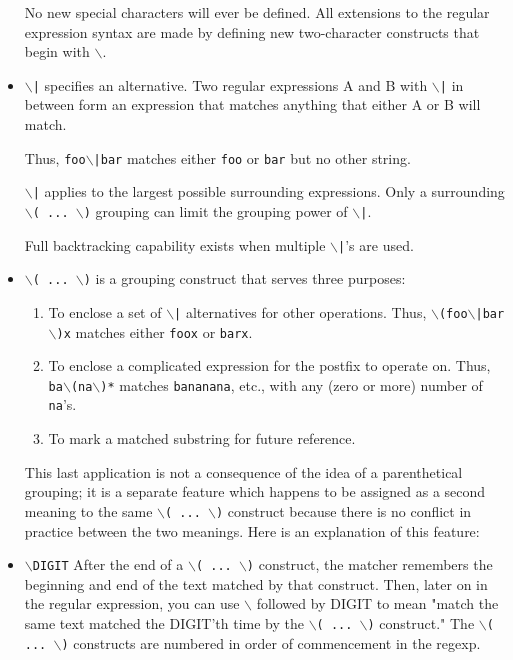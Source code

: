 \begin{itemize}
No new special characters will ever be defined. All extensions
to the regular expression syntax are made by defining new
two-character constructs that begin with {\tt $\backslash$}.

\item \rtfsp
{\tt $\backslash$|} 
specifies an alternative. Two regular expressions A and B with
{\tt $\backslash$|} in between form an expression that matches anything that
either A or B will match.

Thus, {\tt foo$\backslash$|bar} matches either {\tt foo} or {\tt bar} but no other
string.

{\tt $\backslash$|} applies to the largest possible surrounding expressions. 
Only a surrounding {\tt $\backslash$( ... $\backslash$)} grouping can limit the grouping
power of {\tt $\backslash$|}.

Full backtracking capability exists when multiple {\tt $\backslash$|}'s are used.

\item \rtfsp
{\tt $\backslash$( ... $\backslash$)} 
is a grouping construct that serves three purposes:
\begin{enumerate}
\item To enclose a set of {\tt $\backslash$|} alternatives for other operations.
Thus, {\tt $\backslash$(foo$\backslash$|bar$\backslash$)x} matches either {\tt foox} or {\tt barx}.
\item To enclose a complicated expression for the postfix {\tt *} to
operate on. Thus, {\tt ba$\backslash$(na$\backslash$)*} matches {\tt bananana}, etc.,
with any (zero or more) number of {\tt na}'s.
\item To mark a matched substring for future reference.
\end{enumerate}

This last application is not a consequence of the idea of a
parenthetical grouping; it is a separate feature which happens
to be assigned as a second meaning to the same {\tt $\backslash$( ... $\backslash$)} 
construct because there is no conflict in practice between the
two meanings. Here is an explanation of this feature:

\item \rtfsp
{\tt $\backslash$DIGIT} 
After the end of a {\tt $\backslash$( ... $\backslash$)} construct, the matcher remembers
the beginning and end of the text matched by that construct. 
Then, later on in the regular expression, you can use {\tt $\backslash$}
followed by DIGIT to mean "match the same text matched the
DIGIT'th time by the {\tt $\backslash$( ... $\backslash$)} construct."  The {\tt $\backslash$( ... $\backslash$)}
constructs are numbered in order of commencement in the regexp.


\end{itemize}

